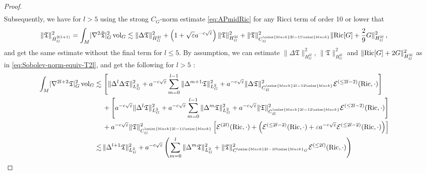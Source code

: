 \documentclass[11pt,leqno,textwidth=10cm]{amsart}
\numberwithin{equation}{section}
\theoremstyle{definition}
\theoremstyle{plain}
\newcommand{\1}{\mathbbm{1}}
\newcommand{\E}{\mathcal{E}}
\newcommand{\Ric}{\text{\normalfont{Ric}}}
\newcommand{\vol}[1]{{\text{\normalfont{vol}}}_{#1}}
\renewcommand{\epsilon}{\varepsilon}
\newcommand{\Lap}{\Delta}
\newcommand{\change}[1]{\color{black}#1\color{black}}
\begin{document}
\begin{proof}
{\begin{align*}
\end{align*}}
\change{Subsequently}, we have \change{for $l>5$ }using the strong $C_G$-norm estimate \eqref{eq:APmidRic} \change{for any Ricci term of order 10 or lower }that
\begin{align*}
\|\mathfrak{T}\|_{\dot{H}^{2(l+1)}_G}^2=\int_M \lvert\nabla^2\tilde{\mathfrak{T}}\rvert_G^2\,\vol{G}\lesssim \|\Lap\mathfrak{T}\|_{\dot{H}^{2l}_G}^2+\left(1+\sqrt{\epsilon}a^{-c\sqrt{\epsilon}}\right)\|\mathfrak{T}\|_{H^{2l}_G}^2+\|\mathfrak{T}\|_{C_G^{\change{2l-11}}}^2\|\Ric[G]+\frac29G\|_{H^{2l}_G}^2\,,
\end{align*}
\change{and get the same estimate without the final term for $l\leq 5.$ }By assumption, we can estimate $\|\Lap\mathfrak{T}\|_{H^{2l}_G}^2$, $\|\mathfrak{T}\|_{H^{2l}_G}^2$ and $\|\Ric[G]+2G\|_{H^{2l}_G}^2$ as in \eqref{eq:Sobolev-norm-equiv-T2l}, and get the following \change{for $l>5$} :
\begin{align*}
\int_M\lvert\nabla^{2l+2}\mathfrak{T}\rvert_G^2\,\vol{G}\lesssim&\,\left[\|\Lap^{l}\Lap\mathfrak{T}\|^2_{L^2_G}+a^{-c\sqrt{\epsilon}}\sum_{m=0}^{l-1}\|\Lap^{m+1}\mathfrak{T}\|_{L^2_G}^2+a^{-c\sqrt{\epsilon}}\|\Lap\mathfrak{T}\|_{C^{\change{2l-12}}_G}^2\E^{(\leq 2l-2)}(\Ric,\cdot)\right]\\
&\,+\left[a^{-c\sqrt{\epsilon}}\|\Lap^l\mathfrak{T}\|_{L^2_G}^2+a^{-c\sqrt{\epsilon}}\sum_{m=0}^{l-1}\|\Lap^{m}\mathfrak{T}\|^2_{L^2_G}+a^{-c\sqrt{\epsilon}}\|\mathfrak{T}\|_{C^{\change{2l-12}}_G}^2\E^{(\leq 2l-2)}(\Ric,\cdot)\right]\\
&\,+a^{-c\sqrt{\epsilon}}\|\mathfrak{T}\|_{C^{\change{2l-11}}_G}^2\left[\E^{(2l)}(\Ric,\cdot)+\left(\E^{(\leq 2l-2)}(\Ric,\cdot)+\epsilon a^{-c\sqrt{\epsilon}}\E^{(\leq 2l-2)}(\Ric,\cdot)\right)\right]\\
\lesssim&\,\|\Lap^{l+1}\mathfrak{T}\|_{L^2_G}^2+a^{-c\sqrt{\epsilon}}\left(\sum_{m=0}^l\|\Lap^m\mathfrak{T}\|_{L^2_G}^2+\|\mathfrak{T}\|_{C^{\change{2l-10}_G}}^2\E^{(\leq 2l)}(\Ric,\cdot)\right)
\end{align*}

\end{proof}
\end{document}
